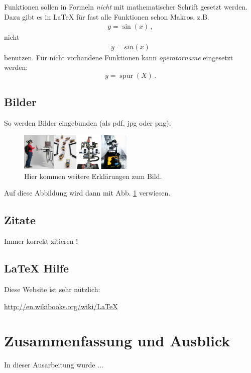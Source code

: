 \documentclass[a4paper]{IEEEtran}
\begin{document}
Funktionen sollen in Formeln \emph{nicht} mit mathematischer Schrift gesetzt werden.
Dazu gibt es in LaTeX für fast alle Funktionen schon Makros, z.B. 
\begin{align}
    y = \sin(x)\,,
\end{align}
nicht 
\begin{align}
    y = sin(x)
\end{align}
benutzen. Für nicht vorhandene Funktionen kann \emph{operatorname} eingesetzt werden:
\begin{equation}
    y = \operatorname{spur}(X) \,.
\end{equation}

\subsection{Bilder}

So werden Bilder eingebunden (als pdf, jpg oder png):

\begin{figure}[!h]
    \centering
    \includegraphics[width=0.48\textwidth]{Bild.png}
    \caption{Hier kommen weitere Erklärungen zum Bild.}
    \label{fig:bild}
\end{figure}

Auf diese Abbildung wird dann mit Abb. \ref{fig:bild} verwiesen.

\subsection{Zitate}

Immer korrekt zitieren \cite{yaakov_bar-shalom_estimation_2001}!

\subsection{LaTeX Hilfe}

Diese Website ist sehr nützlich:

\url{http://en.wikibooks.org/wiki/LaTeX}

\section{Zusammenfassung und Ausblick}

In dieser Ausarbeitung wurde ...



\end{document}
